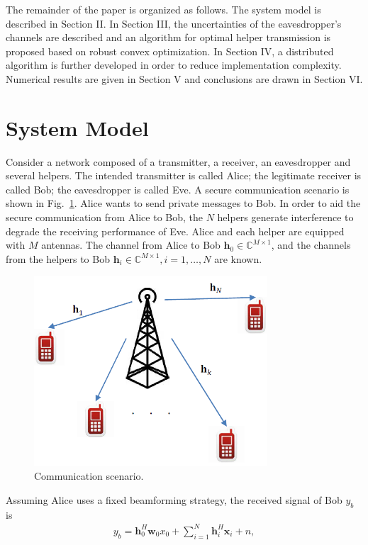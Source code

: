 \documentclass[journal]{IEEEtran}
\begin{document}
The remainder of the paper is organized as follows.  The system model is described in Section II.  In Section III, the uncertainties of the eavesdropper's channels are described and an algorithm for optimal helper transmission is proposed based on robust convex optimization.  In Section IV, a distributed algorithm is further developed in order to reduce implementation complexity.  Numerical results are given in Section V and conclusions are drawn in Section VI.

\section{System Model} \label{sec:system model}
Consider a network composed of a transmitter, a receiver, an eavesdropper and several helpers. The intended transmitter is called Alice; the legitimate receiver is called Bob; the eavesdropper is called Eve. A secure communication scenario is shown in Fig.~\ref{fig:system}. Alice wants to send private messages to Bob. In order to aid the secure communication from Alice to Bob, the $N$ helpers generate interference to degrade the receiving performance of Eve.  Alice and each helper are equipped with $M$ antennas. The channel from Alice to Bob $\mathbf{h}_0 \in \mathbb{C}^{M \times 1}$, and the channels from the helpers to Bob $\mathbf{h}_i \in \mathbb{C}^{M \times 1}, i = 1,\ldots,N$ are known.
\begin{figure}[!tb]
	\centering
	\includegraphics[width=8.7cm]{system.png} %
	\caption{Communication scenario.}
	\label{fig:system}
\end{figure}
Assuming Alice uses a fixed beamforming strategy, the received signal of Bob $y_b$ is
\begin{eqnarray}
y_b =\mathbf{h}_{0}^{H}\mathbf{w}_0 x_0 + \sum_{i=1}^N \mathbf{h}_{i}^H\mathbf{x}_{i} + n,
\end{eqnarray}
\end{document}
